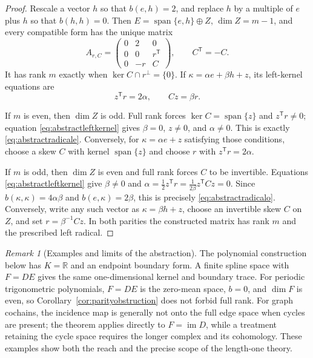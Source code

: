 \documentclass[11pt,a4paper]{article}
\theoremstyle{definition}
\theoremstyle{remark}
\newtheorem{remark}[theorem]{Remark}
\newcommand{\R}{\mathbb{R}}
\newcommand{\Ker}{\operatorname{ker}}
\newcommand{\im}{\operatorname{im}}
\newcommand{\spanof}{\operatorname{span}}
\begin{document}
\begin{proof}
Rescale a vector $h$ so that $b(e,h)=2$, and replace $h$ by a multiple of $e$ plus $h$ so
that $b(h,h)=0$.  Then
$E=\spanof\{e,h\}\oplus Z$, $\dim Z=m-1$, and every compatible form has the unique matrix
\begin{equation}\label{eq:abstractranktwonormal}
 A_{r,C}=
 \begin{pmatrix}
 0&2&0\\
 0&0&r^{\mathsf T}\\
 0&-r&C
 \end{pmatrix},
 \qquad C^{\mathsf T}=-C.
\end{equation}
It has rank $m$ exactly when
$\Ker C\cap r^\perp=\{0\}$.  If
$\kappa=\alpha e+\beta h+z$, its left-kernel equations are
\begin{equation}\label{eq:abstractleftkernel}
 z^{\mathsf T}r=2\alpha,
 \qquad Cz=\beta r.
\end{equation}

If $m$ is even, then $\dim Z$ is odd.  Full rank forces
$\Ker C=\spanof\{z\}$ and $z^{\mathsf T}r\neq0$; equation
\eqref{eq:abstractleftkernel} gives $\beta=0$, $z\neq0$, and $\alpha\neq0$.  This is exactly
\eqref{eq:abstractradicale}.  Conversely, for
$\kappa=\alpha e+z$ satisfying those conditions, choose a skew $C$ with kernel
$\spanof\{z\}$ and choose $r$ with $z^{\mathsf T}r=2\alpha$.

If $m$ is odd, then $\dim Z$ is even and full rank forces $C$ to be invertible.  Equations
\eqref{eq:abstractleftkernel} give $\beta\neq0$ and
$\alpha=\tfrac12z^{\mathsf T}r=\tfrac1{2\beta}z^{\mathsf T}Cz=0$.  Since
$b(\kappa,\kappa)=4\alpha\beta$ and $b(e,\kappa)=2\beta$, this is precisely
\eqref{eq:abstractradicalo}.  Conversely, write any such vector as
$\kappa=\beta h+z$, choose an invertible skew $C$ on $Z$, and set
$r=\beta^{-1}Cz$.  In both parities the constructed matrix has rank $m$ and the prescribed
left radical.
\end{proof}

\begin{remark}[Examples and limits of the abstraction]\label{rem:abstractexamples}
The polynomial construction below has $K=\R$ and an endpoint boundary form.  A finite spline
space with $F=DE$ gives the same one-dimensional kernel and boundary trace.  For periodic
trigonometric polynomials, $F=DE$ is the zero-mean space, $b=0$, and $\dim F$ is even, so
Corollary~\ref{cor:parityobstruction} does not forbid full rank.  For graph cochains, the
incidence map is generally not onto the full edge space when cycles are present; the theorem
applies directly to $F=\im D$, while a treatment retaining the cycle space requires the
longer complex and its cohomology.  These examples show both the reach and the precise scope
of the length-one theory.
\end{remark}
\end{document}
